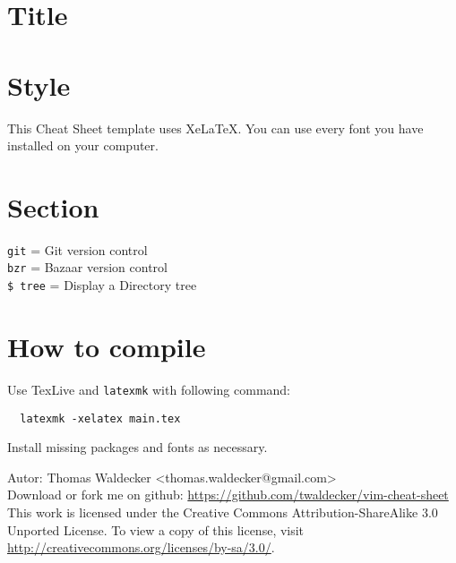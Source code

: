 \documentclass[10pt,DIV=50,landscape,pagesize,parskip=off]{scrartcl}
\begin{document}
\section*{{\Huge {}Title}}
\begin{multicols}{3}

\section{Style}
This Cheat Sheet template uses XeLaTeX.
You can use every font you have installed on your computer.

\section{Section}

\lstinline|git| = Git version control\\
\lstinline|bzr| = Bazaar version control\\
\lstinline|$ tree| = Display a Directory tree

\section{How to compile}
Use TexLive and \lstinline|latexmk| with following command:

\begin{lstlisting}
  latexmk -xelatex main.tex
\end{lstlisting}

Install missing packages and fonts as necessary.

\begin{framed}
{\small Autor: Thomas Waldecker <thomas.waldecker@gmail.com>\\
Download or fork me on github: \url{https://github.com/twaldecker/vim-cheat-sheet}\\
This work is licensed under the
Creative Commons Attribution-ShareAlike 3.0 Unported License. To view a copy of
this license, visit \url{http://creativecommons.org/licenses/by-sa/3.0/}.}
\end{framed}

\end{multicols}
\end{document}
